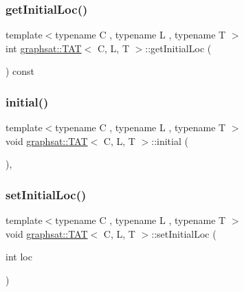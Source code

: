 \mbox{\label{classgraphsat_1_1_t_a_t_a214a257f7368c269c57a06133bd68fab}} 
\subsubsection{\texorpdfstring{getInitialLoc()}{getInitialLoc()}}
{\footnotesize\ttfamily template$<$typename C , typename L , typename T $>$ \\
int \mbox{\hyperlink{classgraphsat_1_1_t_a_t}{graphsat\+::\+T\+AT}}$<$ C, L, T $>$\+::get\+Initial\+Loc (\begin{DoxyParamCaption}{ }\end{DoxyParamCaption}) const\hspace{0.3cm}{\ttfamily [inline]}}

\mbox{\label{classgraphsat_1_1_t_a_t_af9a158cc51508cb3c61b0025fbaebb88}} 
\subsubsection{\texorpdfstring{initial()}{initial()}}
{\footnotesize\ttfamily template$<$typename C , typename L , typename T $>$ \\
void \mbox{\hyperlink{classgraphsat_1_1_t_a_t}{graphsat\+::\+T\+AT}}$<$ C, L, T $>$\+::initial (\begin{DoxyParamCaption}{ }\end{DoxyParamCaption})\hspace{0.3cm}{\ttfamily [inline]}, {\ttfamily [private]}}

\mbox{\label{classgraphsat_1_1_t_a_t_a06f6fb8865991918c0f0ea713344a640}} 
\subsubsection{\texorpdfstring{setInitialLoc()}{setInitialLoc()}}
{\footnotesize\ttfamily template$<$typename C , typename L , typename T $>$ \\
void \mbox{\hyperlink{classgraphsat_1_1_t_a_t}{graphsat\+::\+T\+AT}}$<$ C, L, T $>$\+::set\+Initial\+Loc (\begin{DoxyParamCaption}\item[{int}]{loc }\end{DoxyParamCaption})\hspace{0.3cm}{\ttfamily [inline]}}

